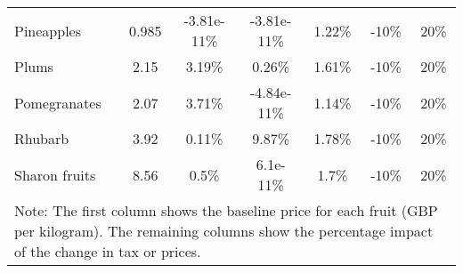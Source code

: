 \documentclass[11pt]{article}
\begin{document}
\begin{table}[h]
\begin{center}
\begin{tabular}{lcccccc}
Pineapples &0.985 &-3.81e-11\% &-3.81e-11\% &1.22\% &-10\% &20\% \\
Plums &2.15 &3.19\% &0.26\% &1.61\% &-10\% &20\% \\
Pomegranates &2.07 &3.71\% &-4.84e-11\% &1.14\% &-10\% &20\% \\
\hline
Rhubarb &3.92 &0.11\% &9.87\% &1.78\% &-10\% &20\% \\
Sharon fruits &8.56 &0.5\% &6.1e-11\% &1.7\% &-10\% &20\% \\
 \hline \hline
\multicolumn{7}{p{0.8 \textwidth}}{Note: The first column shows the baseline price for each fruit (GBP per kilogram). The remaining columns show the percentage impact of the change in tax or prices.}
\end{tabular}
\end{center}
\end{table}
\end{document}
